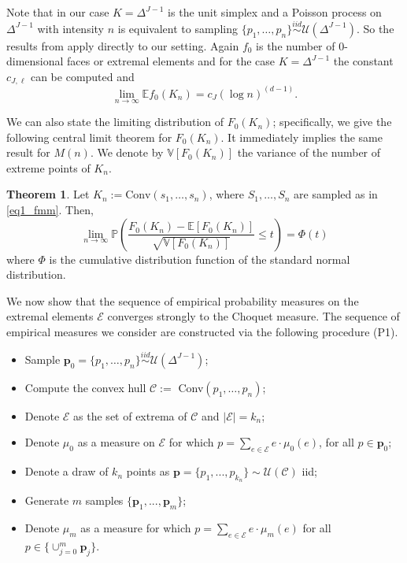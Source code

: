 \documentclass[12pt, reqno]{amsart}
\theoremstyle{definition}
\newtheorem{theorem}{Theorem}%
\begin{document}
Note that in our case $K= \Delta^{J-1}$ is the unit simplex and a Poisson process on $\Delta^{J-1}$ with intensity $n$ is equivalent to sampling $\{p_1,\ldots,p_n\} \stackrel{iid}{\sim} \mathcal{U}(\Delta^{J-1})$.  So the results from
 \cite{barany} apply directly to our setting. Again $f_0$ is the number of $0$-dimensional faces or extremal elements and for the case $K= \Delta^{J-1}$ the constant $c_{J,\ell}$ can be computed and
 $$\lim_{n \rightarrow \infty} \mathbb{E} f_0(K_n)   = c_{J} (\log n)^{(d-1)}.$$



We can also state the limiting distribution of $F_0(K_n)$; specifically, we give the following central limit theorem for $F_0(K_n)$. It immediately implies the same result for $M(n)$. We denote by $\mathbb{V}[F_0(K_n)]$ the variance of the number of extreme points of $K_n$.
\begin{theorem}\label{growthdist}
Let $K_n :=\text{Conv}({s}_1,\ldots,{s}_{n})$, where ${S}_1,\ldots,{S}_{n}$ are sampled as in \eqref{eq1_fmm}. Then,
\begin{equation}\label{second_theorem}
\lim_{n \rightarrow \infty} \mathbb{P} \left( \frac{F_0(K_n) -\mathbb{E}[F_0(K_n)]}{\sqrt{\mathbb{V}[F_0(K_n)]}} \leq t \right) 
= \Phi({t})
\end{equation}
where $\Phi$ is the cumulative distribution function of the standard normal distribution.
\end{theorem}











We now show that the sequence of empirical probability measures on the extremal elements $\mathscr{E}$ converges strongly to the Choquet measure. The sequence of empirical measures we consider are constructed via the following procedure (P1). 
\begin{itemize}\label{P1}
\item[(1)] Sample  $\mathbf{p}_0   = \{p_1,\ldots,p_n\} \stackrel{iid}{\sim} \mathcal{U}(\Delta^{J-1})$;
\item[(2)] Compute the convex hull $\mathscr{C}:=$ Conv$(p_1,\ldots,p_n)$;
\item[(3)] Denote $\mathscr{E}$ as the set of extrema of $\mathscr{C}$ and $|\mathscr{E}| = k_n$;
\item[(4)] Denote  $\mu_0$ as a measure on $\mathscr{E}$ for which $p = \sum_{e \in  \mathscr{E}} e \cdot \mu_0(e)$, for all $p\in \mathbf{p}_0$;
\item[(5)] Denote a draw of $k_n$ points as $\mathbf{p} =  \{p_1,...,p_{k_n}\} \sim \mathcal{U}( \mathscr{C})$ iid;
\item[(6)] Generate $m$ samples $\{\mathbf{p}_1,...,\mathbf{p}_m \}$;
\item[(7)] Denote  $\mu_m$ as a measure for which $p = \sum_{e \in  \mathscr{E}} e \cdot \mu_m(e)$ for all $p\in \{ \cup_{j=0}^m \mathbf{p}_j\}$.
\end{itemize}
\end{document}
